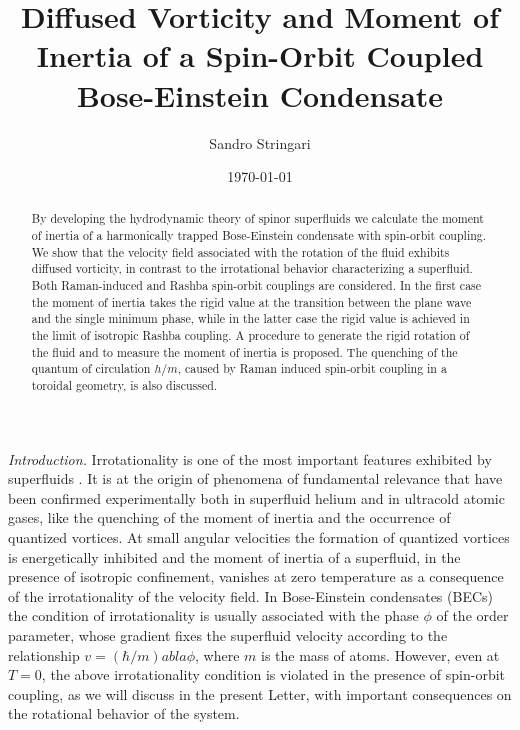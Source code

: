 \title{Diffused Vorticity and Moment of Inertia of a Spin-Orbit Coupled Bose-Einstein Condensate}
\author{Sandro Stringari}
\date{\today}
\begin{abstract}
By developing the hydrodynamic theory of spinor superfluids we calculate the moment of inertia of a harmonically trapped Bose-Einstein condensate with spin-orbit coupling. We show that the velocity field associated with the rotation of the fluid exhibits diffused vorticity, in contrast to the irrotational behavior characterizing a superfluid. Both Raman-induced and Rashba spin-orbit couplings are considered. In the first case the moment of inertia takes the rigid value at the transition between the plane wave and the single minimum phase, while in the latter case the rigid value is achieved in the limit of isotropic Rashba coupling. A procedure to generate the rigid rotation of the fluid and to measure the moment of inertia is proposed. The quenching of the quantum of circulation $h/m$, caused by Raman induced spin-orbit coupling in a toroidal geometry, is also discussed.
\end{abstract}
\maketitle
\textit{Introduction.} Irrotationality is one of the most important features exhibited by superfluids \cite{Hosur,Hosur2}. It is at the origin of phenomena of fundamental relevance that have been confirmed experimentally both in superfluid helium and in ultracold atomic gases, like the quenching of the moment of inertia and the occurrence of quantized vortices. At small angular velocities the formation of quantized vortices is energetically inhibited and the moment of inertia of a superfluid, in the presence of isotropic confinement, vanishes at zero temperature as a consequence of the irrotationality of the velocity field. In Bose-Einstein condensates (BECs) the condition of irrotationality is usually associated with the phase $\phi$ of the order parameter, whose gradient fixes the superfluid velocity according to the relationship $v=(\hbar/m)
abla\phi$, where $m$ is the mass of atoms. However, even at $T=0$, the above irrotationality condition is violated in the presence of spin-orbit coupling, as we will discuss in the present Letter, with important consequences on the rotational behavior of the system.
